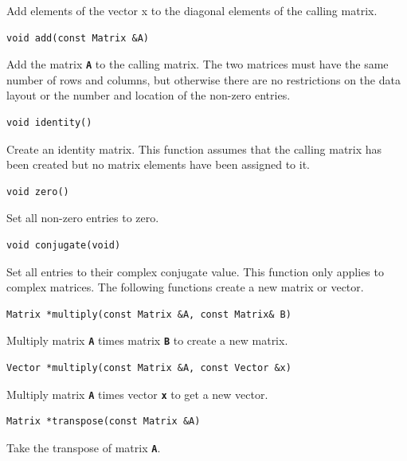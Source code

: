 \documentclass[12pt]{report} %
\begin{document}
Add elements of the vector x to the diagonal elements of the calling matrix.

{
\color{red}
\begin{Verbatim}[fontseries=b]
void add(const Matrix &A)
\end{Verbatim}
}

Add the matrix \texttt{\textbf{A}} to the calling matrix. The two matrices must have the same number of rows and columns, but otherwise there are no restrictions on the data layout or the number and location of the non-zero entries.

{
\color{red}
\begin{Verbatim}[fontseries=b]
void identity()
\end{Verbatim}
}

Create an identity matrix. This function assumes that the calling matrix has been created but no matrix elements have been assigned to it.

{
\color{red}
\begin{Verbatim}[fontseries=b]
void zero()
\end{Verbatim}
}

Set all non-zero entries to zero.

{
\color{red}
\begin{Verbatim}[fontseries=b]
void conjugate(void)
\end{Verbatim}
}

Set all entries to their complex conjugate value. This function only applies to complex matrices.
The following functions create a new matrix or vector.

{
\color{red}
\begin{Verbatim}[fontseries=b]
Matrix *multiply(const Matrix &A, const Matrix& B)
\end{Verbatim}
}

Multiply matrix \texttt{\textbf{A}} times matrix \texttt{\textbf{B}} to create a new matrix.

{
\color{red}
\begin{Verbatim}[fontseries=b]
Vector *multiply(const Matrix &A, const Vector &x)
\end{Verbatim}
}

Multiply matrix \texttt{\textbf{A}} times vector \texttt{\textbf{x}} to get a new vector.

{
\color{red}
\begin{Verbatim}[fontseries=b]
Matrix *transpose(const Matrix &A)
\end{Verbatim}
}

Take the transpose of matrix \texttt{\textbf{A}}.
\end{document}
